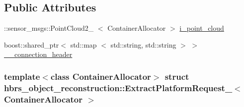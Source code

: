 \subsection*{\-Public \-Attributes}
\begin{DoxyCompactItemize}
\item 
\-::sensor\-\_\-msgs\-::\-Point\-Cloud2\-\_\-\*
$<$ \-Container\-Allocator $>$ \hyperlink{structhbrs__object__reconstruction_1_1_extract_platform_request___ad4b49e131ac9acd23266f639c64def23}{i\-\_\-point\-\_\-cloud}
\item 
boost\-::shared\-\_\-ptr$<$ std\-::map\*
$<$ std\-::string, std\-::string $>$ $>$ \hyperlink{structhbrs__object__reconstruction_1_1_extract_platform_request___a0fb714ab3e397286dfccea2174974c73}{\-\_\-\-\_\-connection\-\_\-header}
\end{DoxyCompactItemize}
\subsubsection*{template$<$class Container\-Allocator$>$ struct hbrs\-\_\-object\-\_\-reconstruction\-::\-Extract\-Platform\-Request\-\_\-$<$ Container\-Allocator $>$}



